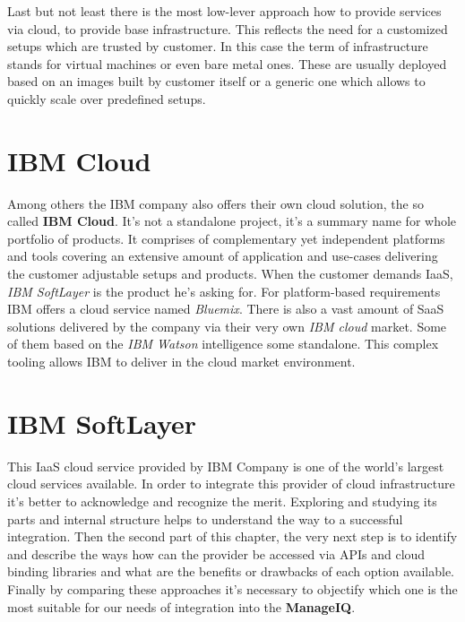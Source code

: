 Last but not least there is the most low-lever approach how to provide services via cloud, to provide base infrastructure. This reflects the need for a customized setups which are trusted by customer. In this case the term of infrastructure stands for virtual machines or even bare metal ones. These are usually deployed based on an images built by customer itself or a generic one which allows to quickly scale over predefined setups.

\chapter{IBM Cloud}
\label{chap:IBM Cloud}

Among others the IBM company also offers their own cloud solution, the so called \textbf{IBM Cloud}. It's not a standalone project, it's a summary name for whole portfolio of products. It comprises of complementary yet independent platforms and tools covering an extensive amount of application and use-cases delivering the customer adjustable setups and products. When the customer demands IaaS, \emph{IBM SoftLayer} is the product he's asking for. For platform-based requirements IBM offers a cloud service named \emph{Bluemix}. There is also a vast amount of SaaS solutions delivered by the company via their very own \emph{IBM cloud} market. Some of them based on the \emph{IBM Watson} intelligence some standalone. This complex tooling allows IBM to deliver in the cloud market environment.


\chapter{IBM SoftLayer}
\label{chap:IBM SoftLayer}

This IaaS cloud service provided by IBM Company is one of the world's largest cloud services available. In order to integrate this provider of cloud infrastructure it's better to acknowledge and recognize the merit. Exploring and studying its parts and internal structure helps to understand the way to a successful integration. Then the second part of this chapter, the very next step is to identify and describe the ways how can the provider be accessed via APIs and cloud binding libraries and what are the benefits or drawbacks of each option available. Finally by comparing these approaches it's necessary to objectify which one is the most suitable for our needs of integration into the \textbf{ManageIQ}.

